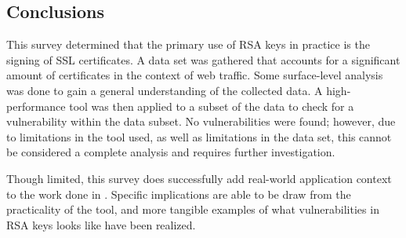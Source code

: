 \documentclass[12pt]{ucthesis}
\begin{document}
%
%
%
\subsection{Conclusions}
This survey determined that the primary use of RSA keys in practice is the
signing of SSL certificates. A data set was gathered that accounts for a
significant amount of certificates in the context of web traffic. Some
surface-level analysis was done to gain a general understanding of the
collected data. A high-performance tool was then applied to a subset of the
data to check for a vulnerability within the data subset. No vulnerabilities
were found; however, due to limitations in the tool used, as well as
limitations in the data set, this cannot be considered a complete analysis
and requires further investigation.

Though limited, this survey does successfully add real-world application
context to the work done in \cite{scharfglass2012breaking}. Specific
implications are able to be draw from the practicality of the tool, and more
tangible examples of what vulnerabilities in RSA keys looks like have been
realized.
\end{document}
